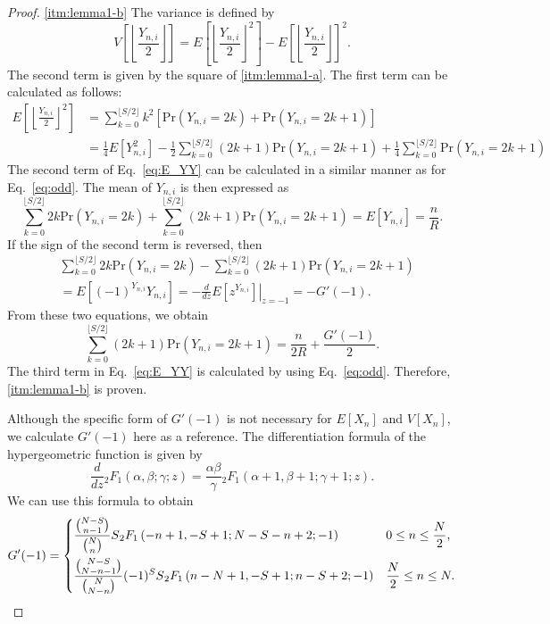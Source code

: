 \documentclass[pre, amsmath, floatfix]{revtex4-2}
\theoremstyle{plain}
\theoremstyle{definition}
\theoremstyle{remark}
\newcommand{\Prob}[1]{\mathrm{Pr}\left(#1\right)} %
\newcommand{\E}[1]{E\left[#1\right]} %
\newcommand{\Var}[1]{V\left[#1\right]} %
\newcommand{\GaussFsymbol}{{}_2F_1} %
\newcommand{\GaussF}[4]{\GaussFsymbol\left(#1, #2; #3; #4\right)} %
\begin{document}
\begin{proof}
\ref{itm:lemma1-b}
The variance is defined by
\[
\Var{\left\lfloor\frac{Y_{n,i}}{2}\right\rfloor}=\E{\left\lfloor\frac{Y_{n,i}}{2}\right\rfloor^2}-\E{\left\lfloor\frac{Y_{n,i}}{2}\right\rfloor}^2.
\]
The second term is given by the square of \ref{itm:lemma1-a}.
The first term can be calculated as follows:
\begin{align}
\E{\left\lfloor\frac{Y_{n,i}}{2}\right\rfloor^2}&=\sum_{k=0}^{\lfloor S/2\rfloor}k^2[\Prob{Y_{n,i}=2k}+\Prob{Y_{n,i}=2k+1}]\nonumber\\
&=\frac{1}{4}\E{Y_{n,i}^2}-\frac{1}{2}\sum_{k=0}^{\lfloor S/2\rfloor}(2k+1)\Prob{Y_{n,i}=2k+1}+\frac{1}{4}\sum_{k=0}^{\lfloor S/2\rfloor}\Prob{Y_{n,i}=2k+1}
\label{eq:E_YY}
\end{align}
The second term of Eq.~\eqref{eq:E_YY} can be calculated in a similar manner as for Eq.~\eqref{eq:odd}.
The mean of $Y_{n,i}$ is then expressed as
\[
\sum_{k=0}^{\lfloor S/2\rfloor}2k\Prob{Y_{n,i}=2k}+\sum_{k=0}^{\lfloor S/2\rfloor}(2k+1)\Prob{Y_{n,i}=2k+1}=\E{Y_{n,i}}=\frac{n}{R}.
\]
If the sign of the second term is reversed, then
\begin{align*}
&\sum_{k=0}^{\lfloor S/2\rfloor}2k\Prob{Y_{n,i}=2k}-\sum_{k=0}^{\lfloor S/2\rfloor}(2k+1)\Prob{Y_{n,i}=2k+1}\\
&=\E{(-1)^{Y_{n,i}}Y_{n,i}}=\left.-\frac{d}{dz}\E{z^{Y_{n,i}}}\right|_{z=-1}=-G'(-1).
\end{align*}
From these two equations, we obtain
\begin{equation}
\sum_{k=0}^{\lfloor S/2\rfloor}(2k+1)\Prob{Y_{n,i}=2k+1}=\frac{n}{2R}+\frac{G'(-1)}{2}.
\label{eq:oddsum_kP}
\end{equation}
The third term in Eq.~\eqref{eq:E_YY} is calculated by using Eq.~\eqref{eq:odd}.
Therefore, \ref{itm:lemma1-b} is proven.

Although the specific form of $G'(-1)$ is not necessary for $\E{X_n}$ and $\Var{X_n}$, we calculate $G'(-1)$ here as a reference.
The differentiation formula of the hypergeometric function is given by~\cite{Olver}
\[
\frac{d}{dz}\GaussF{\alpha}{\beta}{\gamma}{z}=\frac{\alpha\beta}{\gamma}\GaussF{\alpha+1}{\beta+1}{\gamma+1}{z}.
\]
We can use this formula to obtain
\[
G'(-1)=
\begin{dcases}
\dfrac{\binom{N-S}{n-1}}{\binom{N}{n}}S\GaussF{-n+1}{-S+1}{N-S-n+2}{-1} & 0\le n\le \dfrac{N}{2},\\
\dfrac{\binom{N-S}{N-n-1}}{\binom{N}{N-n}}(-1)^S S\GaussF{n-N+1}{-S+1}{n-S+2}{-1} & \dfrac{N}{2}\le n\le N.
\end{dcases}
\]


\end{proof}
\end{document}
